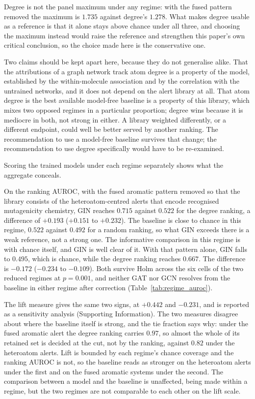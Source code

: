 \documentclass[journal=jcisd8,manuscript=article]{achemso}
\begin{document}
Degree is not the panel maximum under any regime: with the fused pattern removed the maximum
is $1.735$ against degree's $1.278$. What makes degree usable as a reference is that it alone
stays above chance under all three, and choosing the maximum instead would raise the reference
and strengthen this paper's own critical conclusion, so the choice made here is the
conservative one.

Two claims should be kept apart here, because they do not generalise alike. That the
attributions of a graph network track atom degree is a property of the model, established by
the within-molecule association and by the correlation with the untrained networks, and it
does not depend on the alert library at all. That atom degree is the best available
model-free baseline is a property of this library, which mixes two opposed regimes in a
particular proportion; degree wins because it is mediocre in both, not strong in either. A library weighted differently, or a different endpoint, could well be better served
by another ranking. The recommendation to use a model-free baseline survives that change; the
recommendation to use degree specifically would have to be re-examined.

Scoring the trained models under each regime separately shows what the aggregate
conceals.

On the ranking AUROC, with the fused aromatic pattern removed so that the library
consists of the heteroatom-centred alerts that encode recognised mutagenicity chemistry, GIN
reaches $0.715$ against $0.522$ for the degree ranking, a difference of $+0.193$ ($+0.151$ to
$+0.232$). The baseline is close to chance in this regime, $0.522$ against $0.492$ for a
random ranking, so what GIN exceeds there is a weak reference, not a strong one. The
informative comparison in this regime is with chance itself, and GIN is well clear of it. With that pattern alone, GIN falls to $0.495$, which is chance, while the degree ranking
reaches $0.667$. The difference is $-0.172$ ($-0.234$ to $-0.109$). Both survive Holm across
the six cells of the two reduced regimes at $p = 0.001$, and neither GAT nor GCN resolves from
the baseline in either regime after correction (Table~\ref{tab:regime_auroc}).



The lift measure gives the same two signs, at $+0.442$ and $-0.231$, and is reported as a
sensitivity analysis (Supporting Information). The two measures disagree about where
the baseline itself is strong, and the tie fraction says why: under the fused aromatic alert
the degree ranking carries $0.97$, so almost the whole of its retained set is decided at the cut, not by the ranking, against $0.82$ under the heteroatom alerts. Lift is bounded by
each regime's chance coverage and the ranking AUROC is not, so the baseline reads as
stronger on the heteroatom alerts under the first and on the fused aromatic systems under the
second. The comparison between a model and the baseline is unaffected, being made within a
regime, but the two regimes are not comparable to each other on the lift scale.
\end{document}
